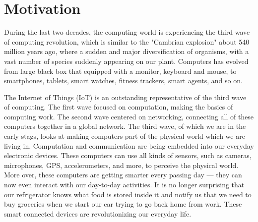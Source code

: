 \chapter{Motivation}\label{motivation}\label{chapter:Motivation}

During the last two decades, the computing world is experiencing the third wave of computing revolution, which is similar to the "Cambrian explosion" about 540 million years ago, where a sudden and major diversification of organisms, with a vast number of species suddenly appearing on our plant. Computers has evolved from large black box that equipped with a monitor, keyboard and mouse, to smartphones, tablets, smart watches, fitness trackers, smart agents, and so on.

The Internet of Things (IoT) is an outstanding representative of the third wave of computing. The first wave focused on computation, making the basics of computing work. The second wave centered on networking, connecting all of these computers together in a global network. The third wave, of which we are in the early stags, looks at making computers part of the physical world which we are living in. Computation and communication are being embedded into our everyday electronic devices. These computers can use all kinds of sensors, such as cameras, microphones, GPS, accelerometers, and more, to perceive the physical world. More over, these computers are getting smarter every passing day --- they can now even interact with our day-to-day activities. It is no longer surprising that our refrigerator knows what food is stored inside it and notify us that we need to buy groceries when we start our car trying to go back home from work. These smart connected devices are revolutionizing our everyday life. 


